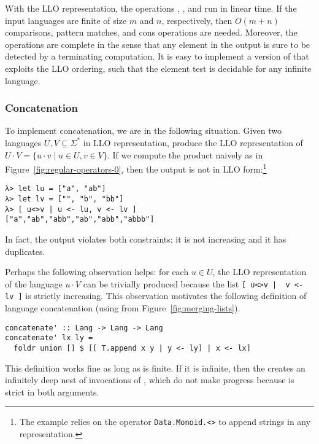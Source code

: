 With the LLO representation, the operations ,
, and  run in linear time. If the input languages
are finite of size $m$ and $n$, respectively, then $O(m+n)$
comparisons, pattern matches, and cons operations are needed.
Moreover, the operations are complete in the sense that any element in
the output is sure to be detected by a terminating computation. 
It is easy to implement a version of  that exploits the LLO ordering,
such that the element test is decidable for any infinite
language.



\subsubsection{Concatenation}
To implement concatenation, we are in the following situation. Given
two languages $U, V \subseteq \Sigma^*$ in LLO representation,
produce the LLO representation of $U \cdot V =  \{ u\cdot v \mid u\in
U, v\in V\}$. If we compute the product naively as in
Figure~\ref{fig:regular-operators-0}, then the output is not in LLO
form:\footnote{The example relies on the operator
  \lstinline{Data.Monoid.<>} to append strings in any representation.}  
\begin{verbatim}
λ> let lu = ["a", "ab"]
λ> let lv = ["", "b", "bb"]
λ> [ u<>v | u <- lu, v <- lv ]
["a","ab","abb","ab","abb","abbb"]
\end{verbatim}
In fact, the output violates both constraints: it is not increasing
and it has duplicates.

Perhaps the following observation helps: for each $u\in U$, the LLO
representation of the language $u\cdot V$ can be trivially produced
because the list \lstinline{[ u<>v |  v <- lv ]} is strictly
increasing. This observation motivates the following definition of
language concatenation (using  from Figure~\ref{fig:merging-lists}).
\begin{lstlisting}
concatenate' :: Lang -> Lang -> Lang
concatenate' lx ly =
  foldr union [] $ [[ T.append x y | y <- ly] | x <- lx]
\end{lstlisting}
This definition works fine as long as  is finite. If it is
infinite, then the  creates an infinitely deep nest of
invocations of , which do not make progress because
 is strict in both arguments.

